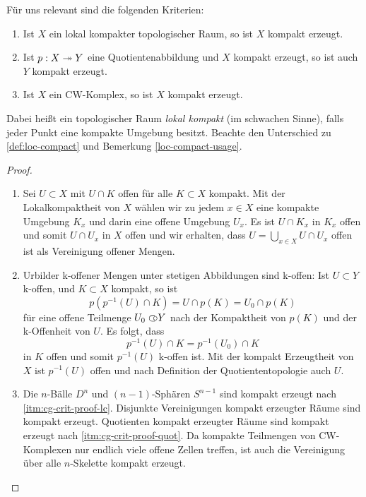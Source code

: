 Für uns relevant sind die folgenden Kriterien:
\begin{lemma} \label{cg-crit}
  \begin{enumerate}[label=(\roman*)]
    \item \label{itm:cg-crit-lc} Ist $X$ ein lokal kompakter
      topologischer Raum, so ist $X$ kompakt erzeugt.
    \item \label{itm:cg-crit-quot} Ist $p: X \twoheadrightarrow Y$ eine
      Quotientenabbildung und $X$ kompakt erzeugt, so ist auch $Y$
      kompakt erzeugt.
     \item \label{itm:cg-crit-cw} Ist $X$ ein CW-Komplex, so ist $X$
       kompakt erzeugt.
  \end{enumerate}
\end{lemma}
Dabei heißt ein topologischer Raum \emph{lokal kompakt} (im schwachen
Sinne), falls jeder Punkt eine kompakte Umgebung besitzt. Beachte den
Unterschied zu \ref{def:loc-compact} und Bemerkung
\ref{loc-compact-usage}.
\begin{proof}
  \begin{enumerate}[label=(\roman*)]
    \item \label{itm:cg-crit-proof-lc} Sei $U \subset X$ mit $U \cap
      K$ offen für alle $K \subset X$ kompakt. Mit der
      Lokalkompaktheit von $X$ wählen wir zu jedem $x \in X$ eine
      kompakte Umgebung $K_x$ und darin eine offene Umgebung $U_x$. Es
      ist $U \cap K_x$ in $K_x$ offen und somit $U \cap U_x$ in $X$
      offen und wir erhalten, dass $U = \bigcup_{x \in X} U \cap U_x$
      offen ist als Vereinigung offener Mengen.
    \item \label{itm:cg-crit-proof-quot} Urbilder k-offener Mengen
      unter stetigen Abbildungen sind k-offen: Ist $U \subset Y$
      k-offen, und $K \subset X$ kompakt, so ist
      \[p(p^{-1}(U) \cap K) = U \cap p(K) = U_0 \cap p(K) \]
      für eine offene Teilmenge $U_0 \subset\kern-0.58em\circ Y$ nach der Kompaktheit von
      $p(K)$ und der k-Offenheit von $U$. Es folgt, dass
      \[ p^{-1}(U) \cap K = p^{-1}(U_0) \cap K \]
      in $K$ offen und somit $p^{-1}(U)$ k-offen ist. Mit der kompakt
      Erzeugtheit von $X$ ist $p^{-1}(U)$ offen und nach Definition
      der Quotiententopologie auch $U$.
    \item Die $n$-Bälle $D^n$ und $(n-1)$-Sphären $S^{n-1}$ sind
      kompakt erzeugt nach \ref{itm:cg-crit-proof-lc}. Disjunkte
      Vereinigungen kompakt erzeugter Räume sind kompakt
      erzeugt. Quotienten kompakt erzeugter Räume sind kompakt erzeugt
      nach \ref{itm:cg-crit-proof-quot}. Da kompakte Teilmengen von
      CW-Komplexen nur endlich viele offene Zellen treffen, ist auch
      die Vereinigung über alle $n$-Skelette kompakt erzeugt.
  \end{enumerate}
\end{proof}

